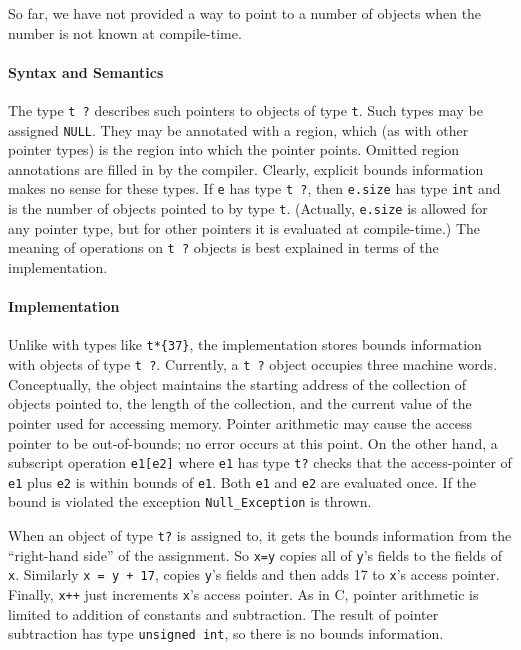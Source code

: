 So far, we have not provided a way to point to a number of objects
when the number is not known at compile-time.


\paragraph{Syntax and Semantics} The type \texttt{t ?} describes such pointers
to objects of type \texttt{t}.  Such types may be assigned
\texttt{NULL}.  They may be annotated with a region, which (as with other
pointer types) is the region into which the pointer points.  Omitted
region annotations are filled in by the compiler.  Clearly,
explicit bounds information makes no sense for these types.  If
\texttt{e} has type \texttt{t ?}, then
\texttt{e.size} has type \texttt{int} and is the number of objects pointed
to by type \texttt{t}.  (Actually, \texttt{e.size} is allowed for any
pointer type, but for other pointers it is evaluated at compile-time.)
The meaning of operations on \texttt{t ?} objects is best explained in
terms of the implementation.

\paragraph{Implementation} Unlike with types like \verb|t*{37}|,
the implementation stores bounds information with objects of type
\texttt{t ?}.  Currently, a \texttt{t ?} object occupies three machine
words.  Conceptually, the object maintains the starting address of the
collection of objects pointed to, the length of the collection, and
the current value of the pointer used for accessing memory.  Pointer
arithmetic may cause the access pointer to be out-of-bounds; no error
occurs at this point.  On the other hand, a subscript operation
\texttt{e1[e2]} where \texttt{e1} has type \texttt{t?} checks that the
access-pointer of \texttt{e1} plus \texttt{e2} is within bounds of
\texttt{e1}.  Both \texttt{e1} and \texttt{e2} are evaluated once.  If the
bound is violated the exception \texttt{Null_Exception} is thrown.

When an object of type \texttt{t?} is assigned to, it gets the bounds
information from the ``right-hand side'' of the assignment.  So
\texttt{x=y} copies all of \texttt{y}'s fields to the fields of \texttt{x}.
Similarly \texttt{x = y + 17}, copies \texttt{y}'s fields and then adds 17
to \texttt{x}'s access pointer.  Finally, \texttt{x++} just increments
\texttt{x}'s access pointer.  As in C, pointer arithmetic is limited to
addition of constants and subtraction.  The result of pointer
subtraction has type \texttt{unsigned int}, so there is no bounds
information.

